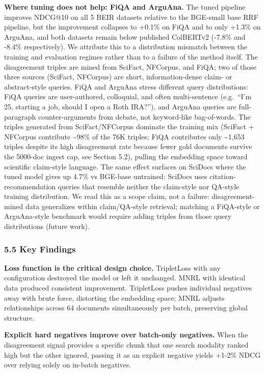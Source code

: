 \documentclass[
  11pt]{article}
\begin{document}
\textbf{Where tuning does not help: FiQA and ArguAna.} The tuned pipeline improves NDCG@10 on all 5 BEIR datasets relative to the BGE-small base RRF pipeline, but the improvement collapses to +0.1\% on FiQA and to only +1.3\% on ArguAna, and both datasets remain below published ColBERTv2 (-7.8\% and -8.4\% respectively). We attribute this to a distribution mismatch between the training and evaluation regimes rather than to a failure of the method itself. The disagreement triples are mined from SciFact, NFCorpus, and FiQA; two of those three sources (SciFact, NFCorpus) are short, information-dense claim- or abstract-style queries. FiQA and ArguAna stress different query distributions: FiQA queries are user-authored, colloquial, and often multi-sentence (e.g.~``I'm 25, starting a job, should I open a Roth IRA?''), and ArguAna queries are full-paragraph counter-arguments from debate, not keyword-like bag-of-words. The triples generated from SciFact/NFCorpus dominate the training mix (SciFact + NFCorpus contribute \textasciitilde98\% of the 76K triples; FiQA contributes only \textasciitilde1,653 triples despite its high disagreement rate because fewer gold documents survive the 5000-doc ingest cap, see Section 5.2), pulling the embedding space toward scientific claim-style language. The same effect surfaces on SciDocs where the tuned model gives up 4.7\% vs BGE-base untrained: SciDocs uses citation-recommendation queries that resemble neither the claim-style nor QA-style training distribution. We read this as a scope claim, not a failure: disagreement-mined data generalizes within claim/QA-style retrieval; matching a FiQA-style or ArguAna-style benchmark would require adding triples from those query distributions (future work).

\subsubsection{5.5 Key Findings}\label{key-findings}

\textbf{Loss function is the critical design choice.} TripletLoss with any configuration destroyed the model or left it unchanged. MNRL with identical data produced consistent improvement. TripletLoss pushes individual negatives away with brute force, distorting the embedding space; MNRL adjusts relationships across 64 documents simultaneously per batch, preserving global structure.

\textbf{Explicit hard negatives improve over batch-only negatives.} When the disagreement signal provides a specific chunk that one search modality ranked high but the other ignored, passing it as an explicit negative yields +1-2\% NDCG over relying solely on in-batch negatives.
\end{document}
